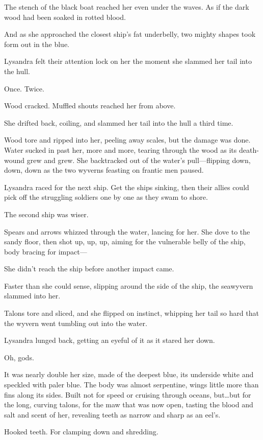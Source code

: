 The stench of the black boat reached her even under the waves.
As if the dark wood had been soaked in rotted blood.

And as she approached the closest ship's fat underbelly, two mighty shapes took form out in the blue.

Lysandra felt their attention lock on her the moment she slammed her tail into the hull.

Once.
Twice.

Wood cracked.
Muffled shouts reached her from above.

She drifted back, coiling, and slammed her tail into the hull a third time.

Wood tore and ripped into her, peeling away scales, but the damage was done.
Water sucked in past her, more and more, tearing through the wood as its death-wound grew and grew.
She backtracked out of the water's pull---flipping down, down, down as the two wyverns feasting on frantic men paused.

Lysandra raced for the next ship.
Get the ships sinking, then their allies could pick off the struggling soldiers one by one as they swam to shore.

The second ship was wiser.

Spears and arrows whizzed through the water, lancing for her.
She dove to the sandy floor, then shot up, up, up, aiming for the vulnerable belly of the ship, body bracing for impact---

She didn't reach the ship before another impact came.

Faster than she could sense, slipping around the side of the ship, the seawyvern slammed into her.

Talons tore and sliced, and she flipped on instinct, whipping her tail so hard that the wyvern went tumbling out into the water.

Lysandra lunged back, getting an eyeful of it as it stared her down.

Oh, gods.

It was nearly double her size, made of the deepest blue, its underside white and speckled with paler blue.
The body was almost serpentine, wings little more than fins along its sides.
Built not for speed or cruising through oceans, but\ldots but for the long, curving talons, for the maw that was now open, tasting the blood and salt and scent of her, revealing teeth as narrow and sharp as an eel's.

Hooked teeth.
For clamping down and shredding.

